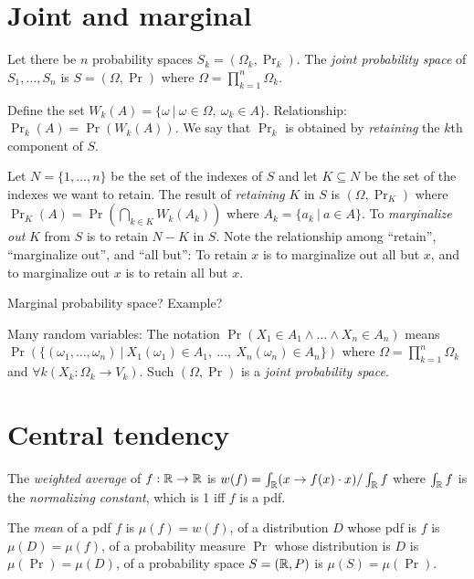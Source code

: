 \section{Joint and marginal}

%
%
%
Let there be \(n\) probability spaces \(S_k = (\Omega_k,\Pr_k)\).
The \emph{joint probability space} of \(S_1,\ldots,S_n\) is
\(S = (\Omega,\Pr)\)
where \(\Omega = \prod_{k=1}^n \Omega_k\).

Define the set \(W_k(A) = \{ \omega ~|~ \omega \in \Omega, ~ \omega_k \in A \}\).
Relationship: \(\Pr_k(A) = \Pr(W_k(A))\).
We say that \(\Pr_k\) is obtained by \emph{retaining} the \(k\)th component of \(S\).

Let \(N = \{1,\ldots,n\}\) be the set of the indexes of \(S\)
and let \(K \subseteq N\) be the set of the indexes we want to retain.
The result of
%
\emph{retaining} \(K\) in \(S\)
is \((\Omega,\Pr_K)\) where
\(\Pr_K(A) = \Pr\left(\bigcap_{k \in K} W_k(A_k)\right)\)
where \(A_k = \{ a_k ~|~ a \in A \} \).
%
To \emph{marginalize out} \(K\) from \(S\) is to retain \(N-K\) in \(S\).
Note the relationship among ``retain'', ``marginalize out'', and ``all but'':
To retain \(x\) is to marginalize out all but \(x\),
and to marginalize out \(x\) is to retain all but \(x\).

%
%
%
Marginal probability space?
Example?

Many random variables:
The notation \(\Pr(X_1\in A_1 \wedge \ldots \wedge X_n\in A_n)\) means
\(\Pr(\{(\omega_1,\ldots,\omega_n) ~|~ X_1(\omega_1) \in A_1, ~ \ldots, ~ X_n(\omega_n) \in A_n\})\)
where \(\Omega = \prod_{k=1}^n \Omega_k\)
and \(\forall k (X_k : \Omega_k \to V_k)\).
Such \((\Omega,\Pr)\) is a \emph{joint probability space}.

\section{Central tendency}

%
%
The \emph{weighted average} of \(f:\mathbb{R}\to\mathbb{R}\) is
\(w(f) = \int_{\mathbb{R}} (x \to f(x) \cdot x) / \int_{\mathbb{R}} f\)
where \(\int_{\mathbb{R}} f\) is the
%
%
\emph{normalizing constant},
which is 1 iff \(f\) is a pdf.

%
The \emph{mean} of a pdf \(f\) is \(\mu(f) = w(f)\),
%
of a distribution \(D\) whose pdf is \(f\) is \(\mu(D) = \mu(f)\),
%
of a probability measure \(\Pr\) whose distribution is \(D\) is
\(\mu(\Pr) = \mu(D)\),
%
of a probability space \(S = (\mathbb{R},P)\) is \(\mu(S) = \mu(\Pr)\).

